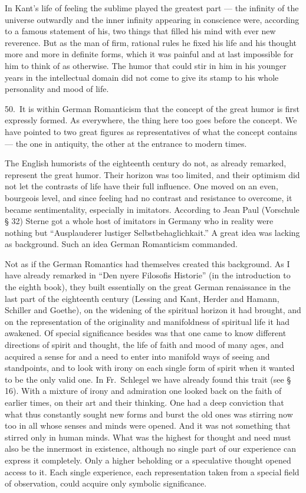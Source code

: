 \documentclass[12pt]{book}
\newcommand{\opage}[1]{\marginnote{\footnotesize\textit{[#1]}}}
\begin{document}
In Kant's life of feeling the sublime played the greatest part --- the infinity of the universe
outwardly and the inner infinity appearing in conscience were, according to a famous statement of
his, two things that filled his mind with ever new reverence. But as the man of firm, rational
rules he fixed his life and his thought more and more in definite forms, which it was painful and
at last impossible for him to think of as otherwise. The humor that could stir in him in his
younger years in the intellectual domain did not come to give its stamp to his whole personality
and mood of life.

50.~It is within German Romanticism that the concept of the great humor is first expressly
formed. %
As everywhere, the thing here too goes before the concept. We have pointed to two great figures as
representatives of what the concept contains --- the one in antiquity, the other at the entrance
to modern times.

The English humorists of the eighteenth century do not, as already remarked, represent the great
humor. Their horizon was too limited, and their optimism did not let the contrasts of life have
their full influence. One moved on an even, bourgeois level, and since feeling had no contrast and
resistance to overcome, it became sentimentality, especially in imitators. According to Jean Paul
(Vorschule § 32) Sterne got a whole host of imitators in Germany who in reality were nothing but
``Ausplauderer lustiger Selbstbehaglichkait.'' A great idea was lacking as background. Such an
idea German Romanticism commanded.

\opage{162}Not as if the German Romantics had themselves created this background. As I have
already remarked in ``Den nyere Filosofis Historie'' (in the introduction to the eighth book), they
built essentially on the great German renaissance in the last part of the eighteenth century
(Lessing and Kant, Herder and Hamann, Schiller and Goethe), on the widening of the spiritual
horizon it had brought, and on the representation of the originality and manifoldness of
spiritual life it had awakened. Of special significance besides was that one came to know
different directions of spirit and thought, the life of faith and mood of many ages, and acquired
a sense for and a need to enter into manifold ways of seeing and standpoints, and to look with
irony on each single form of spirit when it wanted to be the only valid one. In Fr.~Schlegel we
have already found this trait (see § 16). With a mixture of irony and admiration one looked back
on the faith of earlier times, on their art and their thinking. One had a deep conviction that
what thus constantly sought new forms and burst the old ones was stirring now too in all whose
senses and minds were opened. And it was not something that stirred only in human minds. What was
the highest for thought and need must also be the innermost in existence, although no single part
of our experience can express it completely. Only a higher beholding or a speculative thought
opened access to it. Each single experience, each representation taken from a special field of
observation, could acquire only symbolic significance.
\end{document}
